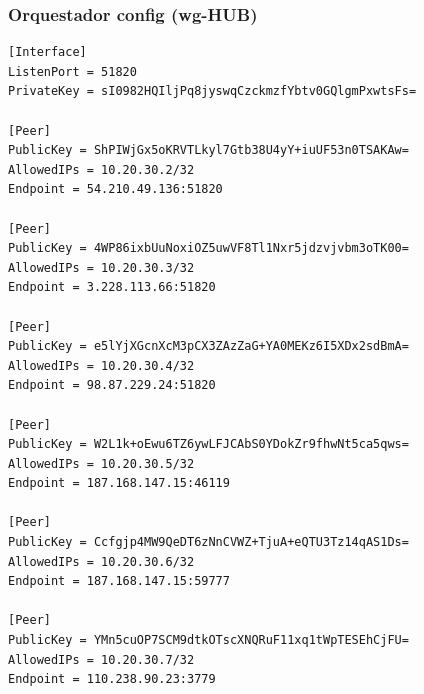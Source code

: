 \documentclass[11pt,a4paper]{article}
\begin{document}
\subsubsection*{Orquestador config (wg-HUB)}
\begin{lstlisting}
[Interface]
ListenPort = 51820
PrivateKey = sI0982HQIljPq8jyswqCzckmzfYbtv0GQlgmPxwtsFs=

[Peer]
PublicKey = ShPIWjGx5oKRVTLkyl7Gtb38U4yY+iuUF53n0TSAKAw=
AllowedIPs = 10.20.30.2/32
Endpoint = 54.210.49.136:51820

[Peer]
PublicKey = 4WP86ixbUuNoxiOZ5uwVF8Tl1Nxr5jdzvjvbm3oTK00=
AllowedIPs = 10.20.30.3/32
Endpoint = 3.228.113.66:51820

[Peer]
PublicKey = e5lYjXGcnXcM3pCX3ZAzZaG+YA0MEKz6I5XDx2sdBmA=
AllowedIPs = 10.20.30.4/32
Endpoint = 98.87.229.24:51820

[Peer]
PublicKey = W2L1k+oEwu6TZ6ywLFJCAbS0YDokZr9fhwNt5ca5qws=
AllowedIPs = 10.20.30.5/32
Endpoint = 187.168.147.15:46119

[Peer]
PublicKey = Ccfgjp4MW9QeDT6zNnCVWZ+TjuA+eQTU3Tz14qAS1Ds=
AllowedIPs = 10.20.30.6/32
Endpoint = 187.168.147.15:59777

[Peer]
PublicKey = YMn5cuOP7SCM9dtkOTscXNQRuF11xq1tWpTESEhCjFU=
AllowedIPs = 10.20.30.7/32
Endpoint = 110.238.90.23:3779

\end{lstlisting}
\end{document}
